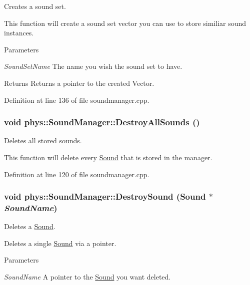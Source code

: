 Creates a sound set. 

This function will create a sound set vector you can use to store similiar sound instances. 
\begin{DoxyParams}{Parameters}
\item[{\em SoundSetName}]The name you wish the sound set to have. \end{DoxyParams}
\begin{DoxyReturn}{Returns}
Returns a pointer to the created Vector. 
\end{DoxyReturn}


Definition at line 136 of file soundmanager.cpp.

\hypertarget{classphys_1_1SoundManager_a0f523240530abd5ab437c9eace78056a}{
\subsubsection[{DestroyAllSounds}]{\setlength{\rightskip}{0pt plus 5cm}void phys::SoundManager::DestroyAllSounds ()}}
\label{d1/dc4/classphys_1_1SoundManager_a0f523240530abd5ab437c9eace78056a}


Deletes all stored sounds. 

This function will delete every \hyperlink{classphys_1_1Sound}{Sound} that is stored in the manager. 

Definition at line 120 of file soundmanager.cpp.

\hypertarget{classphys_1_1SoundManager_a6a996829cab647ccf1ca401361af7167}{
\subsubsection[{DestroySound}]{\setlength{\rightskip}{0pt plus 5cm}void phys::SoundManager::DestroySound ({\bf Sound} $\ast$ {\em SoundName})}}
\label{d1/dc4/classphys_1_1SoundManager_a6a996829cab647ccf1ca401361af7167}


Deletes a \hyperlink{classphys_1_1Sound}{Sound}. 

Deletes a single \hyperlink{classphys_1_1Sound}{Sound} via a pointer. 
\begin{DoxyParams}{Parameters}
\item[{\em SoundName}]A pointer to the \hyperlink{classphys_1_1Sound}{Sound} you want deleted. \end{DoxyParams}


